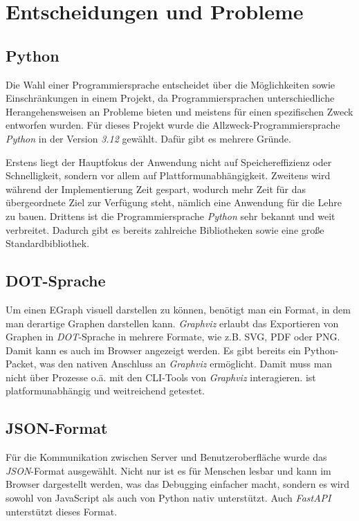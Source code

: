 \section{Entscheidungen und Probleme}\label{sec:entscheidungenundprobleme}

\subsection{Python}

Die Wahl einer Programmiersprache entscheidet über die Möglichkeiten sowie Einschränkungen in einem Projekt, da Programmiersprachen
unterschiedliche Herangehensweisen an Probleme bieten und meistens für einen spezifischen Zweck entworfen wurden.
Für dieses Projekt wurde die Allzweck-Programmiersprache \textit{Python} in der Version \textit{3.12} gewählt.
Dafür gibt es mehrere Gründe. 

\noindent Erstens liegt der Hauptfokus der Anwendung nicht auf Speichereffizienz oder Schnelligkeit, sondern vor allem auf Plattformunabhängigkeit.
Zweitens wird während der Implementierung Zeit gespart, wodurch mehr Zeit für das übergeordnete Ziel zur Verfügung steht, nämlich eine Anwendung
für die Lehre zu bauen.
Drittens ist die Programmiersprache \textit{Python} sehr bekannt und weit verbreitet. Dadurch gibt es bereits zahlreiche Bibliotheken sowie eine große
Standardbibliothek.

\subsection{DOT-Sprache}

Um einen EGraph visuell darstellen zu können, benötigt man ein Format, in dem man derartige Graphen darstellen kann. 
\textit{Graphviz} erlaubt das Exportieren von Graphen in \textit{DOT}-Sprache in mehrere Formate, wie z.B. SVG, PDF oder PNG. 
Damit kann es auch im Browser angezeigt werden.
Es gibt bereits ein Python-Packet, was den nativen Anschluss an \textit{Graphviz} ermöglicht. Damit muss man nicht über Prozesse o.ä. mit den CLI-Tools
von \textit{Graphviz} interagieren.
 ist platformunabhängig und weitreichend getestet.

\subsection{JSON-Format}

Für die Kommunikation zwischen Server und Benutzeroberfläche wurde das \textit{JSON}-Format ausgewählt. Nicht nur ist es für Menschen lesbar und kann im Browser dargestellt werden,
was das Debugging einfacher macht, sondern es wird sowohl von JavaScript als auch von Python nativ unterstützt. Auch \textit{FastAPI} unterstützt dieses Format.

